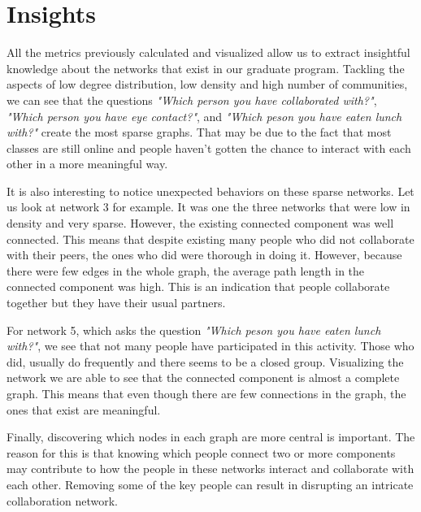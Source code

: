 \section{Insights}
All the metrics previously calculated and visualized allow us to extract insightful knowledge about the networks that exist in our graduate program. Tackling the aspects of low degree distribution, low density and high number of communities, we can see that the questions \textit{"Which person you have collaborated with?"}, \textit{"Which person you have eye contact?"}, and \textit{"Which peson you have eaten lunch with?"} create the most sparse graphs. That may be due to the fact that most classes are still online and people haven't gotten the chance to interact with each other in a more meaningful way.

It is also interesting to notice unexpected behaviors on these sparse networks. Let us look at network 3 for example. It was one the three networks that were low in density and very sparse. However, the existing connected component was well connected. This means that despite existing many people who did not collaborate with their peers, the ones who did were thorough in doing it. However, because there were few edges in the whole graph, the average path length in the connected component was high. This is an indication that people collaborate together but they have their usual partners.

For network 5, which asks the question \textit{"Which peson you have eaten lunch with?"}, we see that not many people have participated in this activity. Those who did, usually do frequently and there seems to be a closed group. Visualizing the network we are able to see that the connected component is almost a complete graph. This means that even though there are few connections in the graph, the ones that exist are meaningful.

Finally, discovering which nodes in each graph are more central is important. The reason for this is that knowing which people connect two or more components may contribute to how the people in these networks interact and collaborate with each other. Removing some of the key people can result in disrupting an intricate collaboration network.